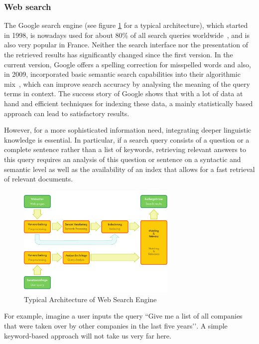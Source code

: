 \documentclass[]{../metanetpaper}
\begin{document}
\begin{multicols}{2}
\subsubsection{Web search}
The Google search engine (see figure \ref{fig:archiwebEn} for a
typical architecture), which started in 1998, is nowadays used for
about 80\% of all search queries worldwide~\cite{googleworld}, and is
also very popular in France. Neither the search interface nor the
presentation of the retrieved results has significantly changed since
the first version. In the current version, Google offers a spelling
correction for misspelled words and also, in 2009, incorporated basic
semantic search capabilities into their algorithmic mix~\cite{googlesemantics}, which can
improve search accuracy by analysing the meaning of the query terms in
context. The success story of Google shows that with a lot of data at
hand and efficient techniques for indexing these data, a mainly
statistically based approach can lead to satisfactory results.

However, for a more sophisticated information need, integrating deeper
linguistic knowledge is essential. In particular, if a search query
consists of a question or a complete sentence rather than a list of
keywords, retrieving relevant answers to this query requires an
analysis of this question or sentence on a syntactic and semantic
level as well as the availability of an index that allows for a fast
retrieval of relevant documents.

\begin{figure}[!ht]
\begin{center}
 \includegraphics[width=3.0in]{../_media/web_search_architecture}
 \caption{Typical Architecture of Web Search Engine}
\label{fig:archiwebEn}
\end{center}
\end{figure}

For example, imagine a user inputs the query ``Give me a list of all
companies that were taken over by other companies in the last five
years{\mbox '}{\mbox '}. A simple keyword-based approach will not take us very far
here.


\end{multicols}
\end{document}
